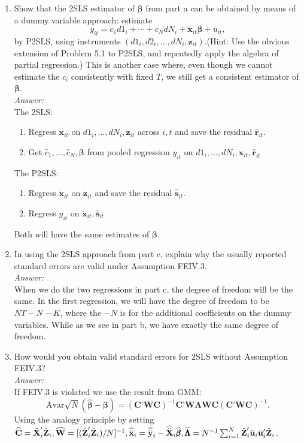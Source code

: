 \documentclass[10pt]{article}
\newcommand{\Av}{\text{Avar}}
\begin{document}
\begin{enumerate}[label=\alph*.]
\item Show that the 2SLS estimator of $\pmb{\beta}$ from part a can be obtained by means of a dummy variable approach: estimate
\[y_{it}=c_1d1_i+\cdots+c_NdN_i+\textbf{x}_{it}\pmb{\beta}+u_{it},\]
by P2SLS, using instruments $(d1_i,d2_i,\ldots,dN_i,\textbf{z}_{it})$.(Hint: Use the obvious extension of Problem 5.1 to P2SLS, and repeatedly apply the algebra of partial regression.) This is another case where, even though we cannot estimate the $c_i$ consistently with fixed $T$, we still get a consistent estimator of $\pmb{\beta}$.
\\ \textit{Answer:}\\
The 2SLS:
\begin{enumerate}
\item Regress $\textbf{x}_{it}$ on $d1_i,\ldots,dN_i,\textbf{z}_{it}$ across $i,t$ and save the residual $\hat{\textbf{r}}_{it}.$
\item Get $\hat{c}_1,\ldots,\hat{c}_N,\pmb{\beta}$ from pooled regression $y_{it}$ on $d1_i,\ldots,dN_i,\textbf{x}_{it},\hat{\textbf{r}}_{it}$
\end{enumerate}
The P2SLS:
\begin{enumerate}
\item Regress $\ddot{\textbf{x}}_{it}$ on $\ddot{\textbf{z}}_{it}$ and save the residual $\hat{\textbf{s}}_{it}.$
\item Regress $y_{it}$ on $\ddot{\textbf{x}}_{it},\hat{\textbf{s}}_{it}$
\end{enumerate}
Both will have the same estimates of $\pmb{\beta}$.

\item In using the 2SLS approach from part c, explain why the usually reported standard errors are valid under Assumption FEIV.3.
\\\textit{Answer:}\\
When we do the two regressions in part c, the degree of freedom will be the same. In the first regression, we will have the degree of freedom to be $NT-N-K$, where the $-N$ is for the additional coefficients on the dummy variables. While as we see in part b, we have exactly the same degree of freedom.

\item How would you obtain valid standard errors for 2SLS without Assumption FEIV.3?
\\\textit{Answer:}\\
If FEIV.3 is violated we use the result from GMM:
\[\Av\sqrt{N}(\hat{\pmb{\beta}}-{\pmb{\beta}})=(\textbf{C'WC})^{-1}\textbf{C'W}\pmb{\Lambda}\textbf{WC}(\textbf{C'WC})^{-1}.\]
Using the analogy principle by setting $\hat{\textbf{C}}=\ddot{\textbf{X}}_i'\ddot{\textbf{Z}}_i,\hat{\textbf{W}}=[(\ddot{\textbf{Z}}_i'\ddot{\textbf{Z}}_i)/N]^{-1},\hat{\ddot{\textbf{x}}}_i=\hat{\ddot{\textbf{y}}}_i-\hat{\ddot{\textbf{X}}}_i\hat{\pmb{\beta}},\\ \hat{\pmb{\Lambda}}=N^{-1}\sum_{i=1}^N\ddot{\textbf{Z}}_i'\ddot{\textbf{u}}_i\ddot{\textbf{u}}_i'\ddot{\textbf{Z}}_i$.
\end{enumerate}
\end{document}

